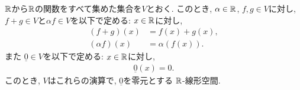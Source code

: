 

\begin{example}
$\mathbb{R}$から$\mathbb{R}$の関数をすべて集めた集合を$V$とおく.
このとき, 
  $\alpha \in\mathbb{R}$, $f,g\in V$に対し,
  $f+g\in V$と$\alpha f\in V$を以下で定める:
  $x\in \mathbb{R}$に対し,
  \begin{align*}
    (f+g)(x) &= f(x)+g(x),\\
    (\alpha f)(x) &= \alpha (f(x)).
  \end{align*}
  また $\underline{0}\in V$を以下で定める:
  $x\in \mathbb{R}$に対し,
  \begin{align*}
    \underline{0}(x)=0.
  \end{align*}
  このとき, $V$はこれらの演算で,
  $\underline{0}$を零元とする
  $\mathbb{R}$-線形空間.

\end{example}

